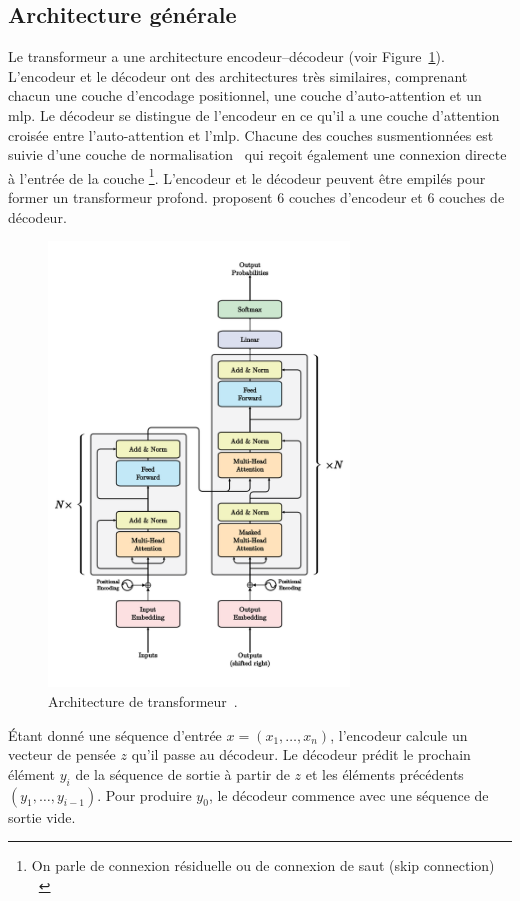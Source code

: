 \subsection{Architecture générale}

Le transformeur a une architecture encodeur--décodeur (voir Figure~\ref{fig.transformer}).
L'encodeur et le décodeur ont des architectures très similaires, 
comprenant chacun une couche d'encodage positionnel, une couche d'auto-attention et un \gls{mlp}.
Le décodeur se distingue de l'encodeur 
en ce qu'il a une couche d'attention croisée entre l'auto-attention et l'\gls{mlp}.
Chacune des couches susmentionnées est suivie d'une couche de normalisation~\cite{Ba_Kiros_Hinton_2016}
qui reçoit également une connexion directe à l'entrée de la couche%
\footnote{%
    On parle de connexion résiduelle ou de connexion de saut \foreignlanguage{english}{(skip connection)}%
    ~\cite{He_Zhang_Ren_Sun_2016}
}.
L'encodeur et le décodeur peuvent être empilés pour former un transformeur profond.
\citeauthor{attention} proposent \(6\) couches d'encodeur et \(6\) couches de décodeur.

\begin{figure}[htb]
    \centering
    \includegraphics[width=8cm]{assets/images/transformer.png}
    \caption[L'architecture de transformeur.]
    {Architecture de transformeur~\cite{attention}.}
    \label{fig.transformer}
\end{figure}

Étant donné une séquence d'entrée \(x = (x_1, \ldots, x_n)\),
l'encodeur calcule un vecteur de pensée \(z\) qu'il passe au décodeur.
Le décodeur prédit le prochain élément \(y_i\) de la séquence de sortie 
à partir de \(z\) et les éléments précédents \((y_1, \ldots, y_{i-1})\).
Pour produire \(y_0\), le décodeur commence avec une séquence de sortie vide.

